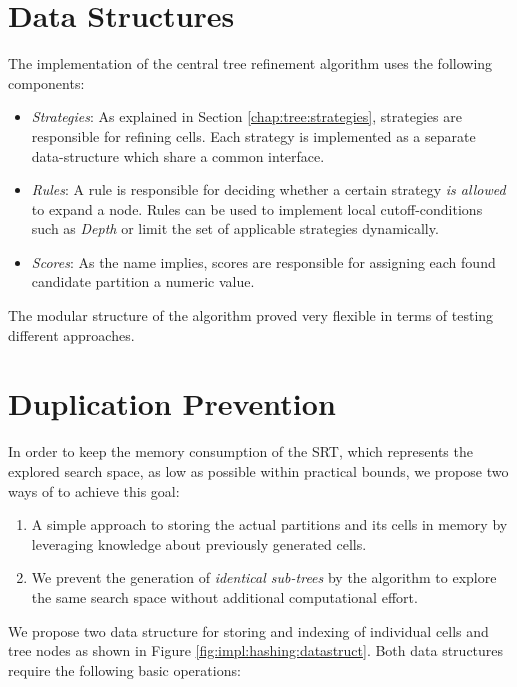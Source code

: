 	\section{Data Structures}
	\label{chap:impl:structures}

		The implementation of the central tree refinement algorithm uses the following components:

		\begin{itemize}
			\item \textit{Strategies}: As explained in Section \ref{chap:tree:strategies}, strategies are responsible for refining cells. Each strategy is implemented as a separate data-structure which share a common interface.
			\item \textit{Rules}: A rule is responsible for deciding whether a certain strategy \textit{is allowed} to expand a node. Rules can be used to implement local cutoff-conditions such as \textit{Depth} or limit the set of applicable strategies dynamically.
			\item \textit{Scores}: As the name implies, scores are responsible for assigning each found candidate partition a numeric value.
		\end{itemize}

		The modular structure of the algorithm proved very flexible in terms of testing different approaches.

		\clearpage

	\section{Duplication Prevention}
	\label{chap:impl:hashing}

		In order to keep the memory consumption of the \ac{SRT}, which represents the explored search space, as low as possible within practical bounds, we propose two ways of to achieve this goal:

		\begin{enumerate}
			\item A simple approach to storing the actual partitions and its cells in memory by leveraging knowledge about previously generated cells.
			\item We prevent the generation of \textit{identical sub-trees} by the algorithm to explore the same search space without additional computational effort.
		\end{enumerate}

		We propose two data structure for storing and indexing of individual cells and tree nodes as shown in Figure \ref{fig:impl:hashing:datastruct}.
		Both data structures require the following basic operations:

